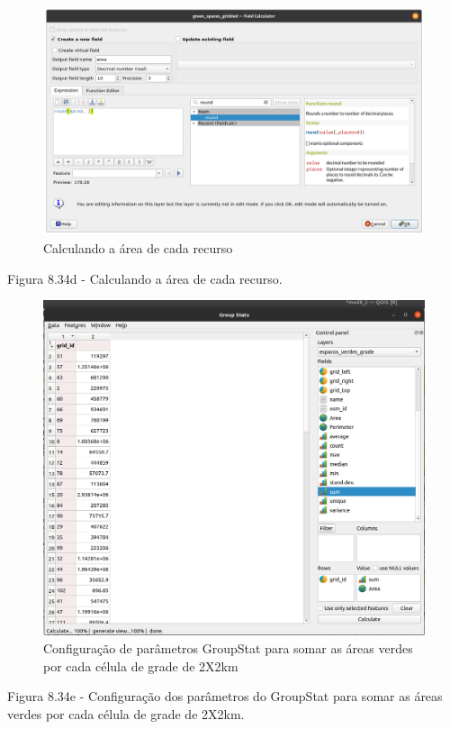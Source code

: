 \documentclass[
  portuguese,
]{krantz}
\begin{document}
\begin{figure}
\centering
\includegraphics{media/modulo8/fig834_d.png}
\caption{Calculando a área de cada recurso}
\end{figure}

Figura 8.34d - Calculando a área de cada recurso.

\begin{figure}
\centering
\includegraphics{media/modulo8/fig834_e.png}
\caption{Configuração de parâmetros GroupStat para somar as áreas verdes por cada célula de grade de 2X2km}
\end{figure}

Figura 8.34e - Configuração dos parâmetros do GroupStat para somar as áreas verdes por cada célula de grade de 2X2km.
\end{document}

